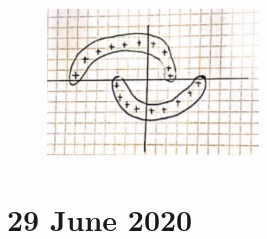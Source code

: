 \documentclass[a4paper,11pt,oneside]{book}
\begin{document}
 \begin{solution}
    \begin{figure}[H]
        \centering
        \includegraphics[width=0.5\textwidth,height=0.5\textheight,keepaspectratio]{images/3_4_28_Jan_2021.png}
     \end{figure}
 \end{solution}


 \chapter{29 June 2020}
\end{document}
